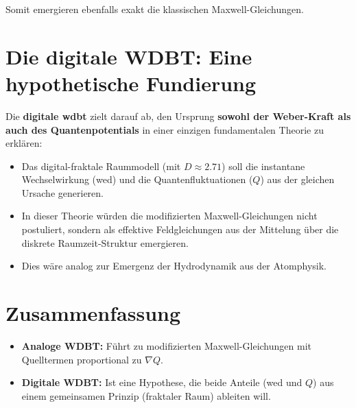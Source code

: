 Somit emergieren ebenfalls exakt die klassischen Maxwell-Gleichungen.

\section{Die digitale WDBT: Eine hypothetische Fundierung}
Die \textbf{digitale \gls{wdbt}} zielt darauf ab, den Ursprung \textbf{sowohl der Weber-Kraft als auch des Quantenpotentials} in einer einzigen fundamentalen Theorie zu erklären:

\begin{itemize}
    \item Das digital-fraktale Raummodell (mit $D \approx 2.71$) soll die instantane Wechselwirkung (\gls{wed}) und die Quantenfluktuationen ($Q$) aus der gleichen Ursache generieren.
    \item In dieser Theorie würden die modifizierten Maxwell-Gleichungen nicht postuliert, sondern als effektive Feldgleichungen aus der Mittelung über die diskrete Raumzeit-Struktur emergieren.
    \item Dies wäre analog zur Emergenz der Hydrodynamik aus der Atomphysik.
\end{itemize}

\section{Zusammenfassung}
\begin{itemize}
    \item \textbf{Analoge WDBT:} Führt zu modifizierten Maxwell-Gleichungen mit Quelltermen proportional zu $\nabla Q$.
    \item \textbf{Digitale WDBT:} Ist eine Hypothese, die beide Anteile (\gls{wed} und $Q$) aus einem gemeinsamen Prinzip (fraktaler Raum) ableiten will.
\end{itemize}

